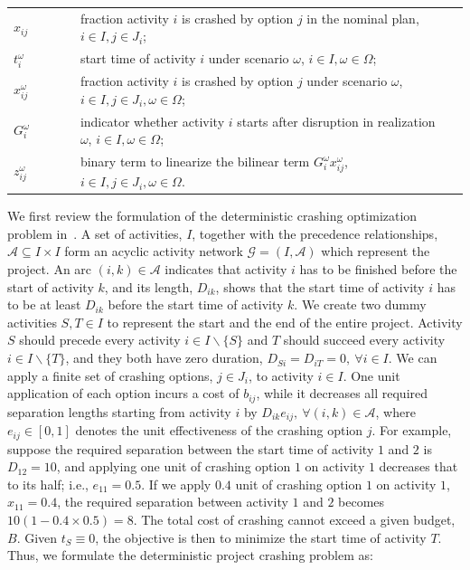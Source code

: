 \documentclass[11pt]{article}
\newcommand{\noi}{\noindent}
\begin{document}
\begin{longtable}[H]{ l l l l }
		\(x_{ij}\) & \(\qquad\) & fraction activity \(i\) is crashed by option \(j\) in the nominal plan, \(i \in I, j \in J_i\); &\\
		\(t_{i}^\omega\) & \(\qquad\) & start time of activity \(i\) under scenario \(\omega\), \(i \in I, \omega \in \Omega\);&\\
		\(x_{ij}^\omega\) & \(\qquad\) & fraction activity \(i\) is crashed by option \(j\) under scenario \(\omega\), \(i \in I, j \in J_i, \omega \in \Omega \); &\\
		\(G_i^\omega\) & \(\qquad\) & indicator whether activity \(i\) starts after disruption in realization \(\omega\), \(i \in I, \omega \in \Omega\);&\\
		\(z_{ij}^\omega\) & \(\qquad\) & binary term to linearize the bilinear term \(G_i^\omega x_{ij}^\omega\), \(i \in I, j \in J_{i}, \omega \in \Omega\).&\\
	\end{longtable}
	\noi We first review the formulation of the deterministic crashing optimization problem in~\cite{fulkerson1961network, kelley1961criticalpath}. A set of activities, \(I\), together with the precedence relationships, \(\mathcal{A} \subseteq I \times I\) form an acyclic activity network \(\mathcal{G} = (I,\mathcal{A})\) which represent the project. An arc \((i,k) \in \mathcal{A}\) indicates that activity \(i\) has to be finished before the start of activity \(k\), and its length, \(D_{ik}\), shows that the start time of activity \(i\) has to be at least \(D_{ik}\) before the start time of activity \(k\). We create two dummy activities \(S, T \in I\) to represent the start and the end of the entire project. Activity \(S\) should precede every activity \(i \in I \backslash \{S\}\) and \(T\) should succeed every activity \(i \in I \backslash \{T\} \), and they both have zero duration, \(D_{Si} = D_{iT} = 0,\ \forall i \in I\). We can apply a finite set of crashing options, \(j \in J_i\), to activity \(i \in I\). One unit application of each option incurs a cost of \(b_{ij}\), while it decreases all required separation lengths starting from activity \(i\) by \(D_{ik}e_{ij},\ \forall (i,k) \in \mathcal{A}\), where \(e_{ij} \in [0,1]\) denotes the unit effectiveness of the crashing option \(j\). For example, suppose the required separation between the start time of activity \(1\) and \(2\) is \(D_{12} = 10\), and applying one unit of crashing option \(1\) on activity \(1\) decreases that to its half; i.e., \(e_{11} = 0.5\). If we apply \(0.4\) unit of crashing option \(1\) on activity \(1\), \(x_{11} = 0.4\), the required separation between activity \(1\) and \(2\) becomes \(10(1 - 0.4 \times 0.5) = 8\). The total cost of crashing cannot exceed a given budget, \(B\). Given $t_S \equiv 0$, the objective is then to minimize the start time of activity \(T\). Thus, we formulate the deterministic project crashing problem as:
\end{document}

